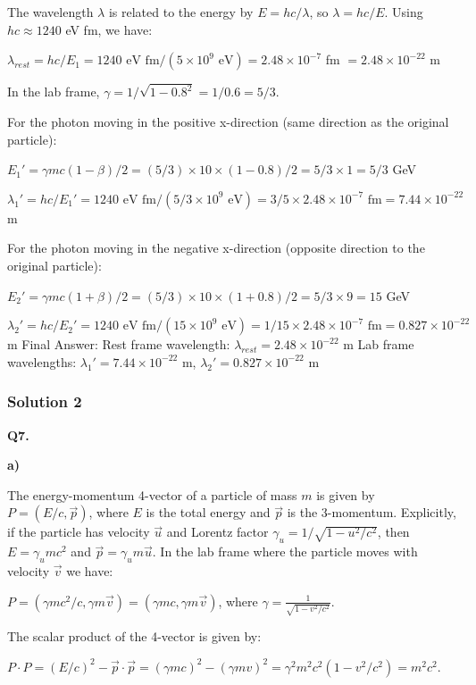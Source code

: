 \documentclass{article}
\begin{document}
The wavelength $\lambda$ is related to the energy by $E = hc/\lambda$, so $\lambda = hc/E$.
Using $hc \approx 1240$ eV fm, we have:

$\lambda_{rest} = hc/E_1 = 1240 \text{ eV fm} / (5 \times 10^9 \text{ eV}) = 2.48 \times 10^{-7}$ fm $= 2.48 \times 10^{-22}$ m

In the lab frame, $\gamma = 1/\sqrt{1 - 0.8^2} = 1/0.6 = 5/3$.

For the photon moving in the positive x-direction (same direction as the original particle):

$E_1' = \gamma mc(1-\beta)/2 = (5/3) \times 10 \times (1-0.8)/2 = 5/3 \times 1 = 5/3$ GeV

$\lambda_1' = hc/E_1' = 1240 \text{ eV fm} / (5/3 \times 10^9 \text{ eV}) = 3/5 \times 2.48 \times 10^{-7} \text{ fm} = 7.44 \times 10^{-22}$ m

For the photon moving in the negative x-direction (opposite direction to the original particle):

$E_2' = \gamma mc(1+\beta)/2 = (5/3) \times 10 \times (1+0.8)/2 = 5/3 \times 9 = 15$ GeV

$\lambda_2' = hc/E_2' = 1240 \text{ eV fm} / (15 \times 10^9 \text{ eV}) = 1/15 \times 2.48 \times 10^{-7} \text{ fm} = 0.827 \times 10^{-22}$ m
Final Answer:
Rest frame wavelength: $\lambda_{rest} = 2.48 \times 10^{-22}$ m
Lab frame wavelengths: $\lambda_1' = 7.44 \times 10^{-22}$ m, $\lambda_2' = 0.827 \times 10^{-22}$ m


\subsubsection{Solution 2}
\textbf{Q7.}

\textbf{a)}

The energy-momentum 4-vector of a particle of mass $m$ is given by $P = (E/c, \vec{p})$, where $E$ is the total energy and $\vec{p}$ is the 3-momentum.
Explicitly, if the particle has velocity $\vec{u}$ and Lorentz factor $\gamma_u = 1/\sqrt{1 - u^2/c^2}$, then $E = \gamma_u mc^2$ and $\vec{p} = \gamma_u m\vec{u}$. In the lab frame where the particle moves with velocity $\vec{v}$ we have:

$P = (\gamma mc^2/c, \gamma m \vec{v}) = (\gamma mc, \gamma m \vec{v})$, where $\gamma = \frac{1}{\sqrt{1-v^2/c^2}}$.

The scalar product of the 4-vector is given by:

$P \cdot P = (E/c)^2 - \vec{p} \cdot \vec{p} = (\gamma mc)^2 - (\gamma m v)^2 = \gamma^2 m^2 c^2 (1 - v^2/c^2) = m^2 c^2$.
\end{document}
